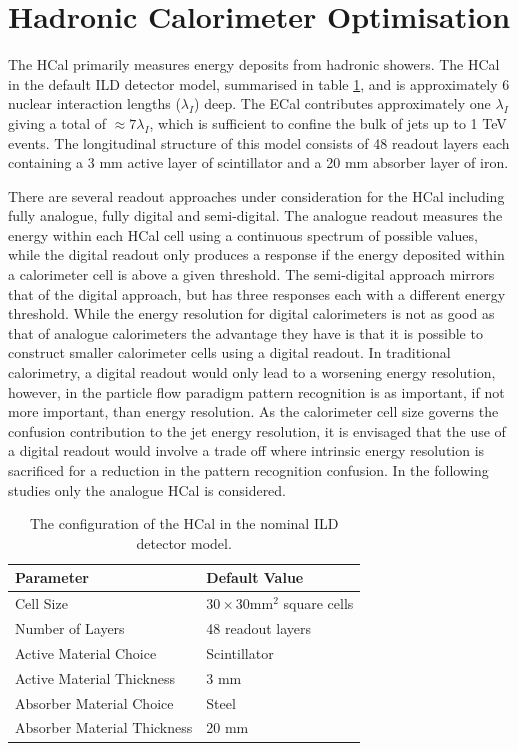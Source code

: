 \section{Hadronic Calorimeter Optimisation}
The HCal primarily measures energy deposits from hadronic showers.  The HCal in the default ILD detector model, summarised in table \ref{table:defaultildhcal}, and is approximately 6 nuclear interaction lengths ($\lambda_{I}$) deep.  The ECal contributes approximately one $\lambda_{I}$ giving a total of $\approx 7 \lambda_{I}$, which is sufficient to confine the bulk of jets up to 1 TeV events.  The longitudinal structure of this model consists of 48 readout layers each containing a 3 mm active layer of scintillator and a 20 mm absorber layer of iron.  

There are several readout approaches under consideration for the HCal including fully analogue, fully digital and semi-digital.  The analogue readout measures the energy within each HCal cell using a continuous spectrum of possible values, while the digital readout only produces a response if the energy deposited within a calorimeter cell is above a given threshold.  The semi-digital approach mirrors that of the digital approach, but has three responses each with a different energy threshold.  While the energy resolution for digital calorimeters is not as good as that of analogue calorimeters the advantage they have is that it is possible to construct smaller calorimeter cells using a digital readout.  In traditional calorimetry, a digital readout would only lead to a worsening energy resolution, however, in the particle flow paradigm pattern recognition is as important, if not more important, than energy resolution.  As the calorimeter cell size governs the confusion contribution to the jet energy resolution, it is envisaged that the use of a digital readout would involve a trade off where intrinsic energy resolution is sacrificed for a reduction in the pattern recognition confusion.  In the following studies only the analogue HCal is considered.

\begin{table}[h!]
\centering
\begin{tabular}{ l l}
\hline
Parameter & Default Value \\
\hline
Cell Size & $30 \times 30 \text{mm}^{2}$ square cells \\
Number of Layers & 48 readout layers \\
Active Material Choice & Scintillator \\
Active Material Thickness & 3 mm  \\
Absorber Material Choice & Steel \\
Absorber Material Thickness & 20 mm \\
\hline
\end{tabular}
\caption[The configuration of the HCal in the nominal ILD detector model.]{The configuration of the HCal in the nominal ILD detector model.}
\label{table:defaultildhcal}
\end{table}

